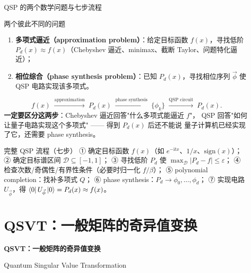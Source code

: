 \documentclass[aspectratio=169,9pt]{ctexbeamer}
\newcommand{\eps}{\varepsilon}
\newcommand{\ii}{\mathrm{i}}
\newcommand{\smallcite}[1]{\par\vspace{1.2mm}{\scriptsize\color{graytext}#1}}
\begin{document}
\begin{frame}{QSP 的两个数学问题与七步流程}
\begin{keybox}{两个彼此不同的问题}
\begin{enumerate}
\item \textbf{多项式逼近（approximation problem）}：给定目标函数 $f(x)$，寻找低阶
$P_d(x)\approx f(x)$（Chebyshev 逼近、minimax、截断 Taylor、问题特化逼近）；
\item \textbf{相位综合（phase synthesis problem）}：已知 $P_d(x)$，寻找相位序列
$\vec\phi$ 使 QSP 电路实现该多项式。
\end{enumerate}
\[
f(x)\;\xrightarrow{\text{approximation}}\;P_d(x)
\;\xrightarrow{\text{phase synthesis}}\;\{\phi_k\}
\;\xrightarrow{\text{QSP circuit}}\;P_d(x).
\]
\textbf{一定要区分这两步}：Chebyshev 逼近回答"什么多项式能逼近 $f$"，
QSP 回答"如何让量子电路实现这个多项式" —— 得到 $P_d(x)$ 后还不能说
量子计算机已经实现了它，还需要 phase synthesis。
\end{keybox}
\begin{keybox}{完整 QSP 流程（七步）}
① 确定目标函数 $f(x)$（如 $e^{-\ii tx}$、$1/x$、$\mathrm{sign}(x)$）；
② 确定目标谱区间 $\mathcal D\subseteq[-1,1]$；
③ 寻找低阶 $P_d$ 使 $\max_{\mathcal D}|P_d-f|\le\eps$；
④ 检查次数/奇偶性/有界性条件（必要时归一化 $f/\beta$）；
⑤ polynomial completion：找补多项式 $Q$；
⑥ phase synthesis：$P_d\to\phi_0,\dots,\phi_d$；
⑦ 实现电路 $U_{\vec\phi}$，得 $\bra0U_{\vec\phi}\ket0=P_d(x)\approx f(x)$。
\end{keybox}
\smallcite{Model 3 笔记第 6.4 节。}
\end{frame}

\section{QSVT：一般矩阵的奇异值变换}
\begin{frame}[plain]
\centering\vspace{2.0cm}
{\Huge\bfseries\color{navy} QSVT：一般矩阵的奇异值变换}\par\vspace{4mm}
{\large Quantum Singular Value Transformation}
\end{frame}
\end{document}
